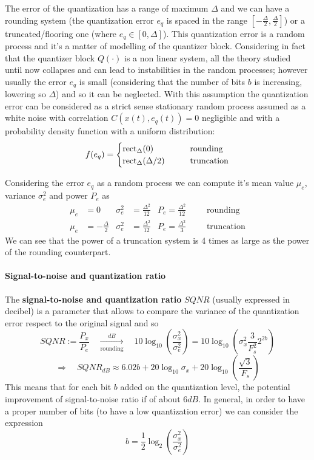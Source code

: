 	The error of the quantization has a range of maximum $\Delta$ and we can have a rounding system (the quantization error $e_q$ is spaced in the range $[-\frac \Delta 2, \frac \Delta 2]$) or a truncated/flooring one (where $e_q \in [0,\Delta]$). This quantization error is a random process and it's a matter of modelling of the quantizer block. Considering in fact that the quantizer block $Q(\cdot)$ is a non linear system, all the theory studied until now collapses and can lead to instabilities in the random processes; however usually the error $e_q$ is small (considering that the number of bits $b$ is increasing, lowering so $\Delta$) and so it can be neglected. With this assumption the quantization error can be considered as a strict sense stationary random process assumed as a white noise with correlation $C(x(t),e_q(t)) = 0$ negligible and with a probability density function with a uniform distribution:
	\[ f(e_q) = \begin{cases}
		\textrm{rect}_{\Delta}(0) \qquad &\textrm{rounding} \\
		\textrm{rect}_{\Delta}(\Delta/2) \qquad &\textrm{truncation} 
	\end{cases} \]
	
	Considering the error $e_q$ as a  random process we can compute it's mean value $\mu_e$, variance $\sigma_e^2$ and power $P_e$ as
	\begin{align*}
		\mu_e &= 0 &\sigma_e^2 &= \frac{\Delta^2}{12} & P_e =  \frac{\Delta^2}{12} &  &&\textrm{rounding} \\
		\mu_e &= -\frac{\Delta}{2} & \sigma_e^2 &= \frac{\Delta^2}{12} & P_e =  \frac{\Delta^2}{3} &  &&\textrm{truncation} 
	\end{align*}
	We can see that the power of a truncation system is 4 times as large as the power of the rounding counterpart.
	
	\paragraph{Signal-to-noise and quantization ratio} The \textbf{signal-to-noise and quantization ratio} $SQNR$ (usually expressed in decibel) is a parameter that allows to compare the variance of the quantization error respect to the original signal and so
	\[ SQNR := \frac{P_x}{P_e}  \quad \xrightarrow[\textrm{rounding}]{dB} \quad 10 \log_{10}\left(\frac{\sigma_x^2}{\sigma_e^2}\right) = 10 \log_{10}\left( \sigma_x^2 \frac{3}{F_s^2}2^{2b} \right)\]
	\[ \Rightarrow \quad SQNR_{dB} \approx 6.02b + 20 \log_{10} \sigma_x + 20 \log_{10}\left(\frac{\sqrt 3}{F_s} \right) \]
	This means that for each bit $b$ added on the quantization level, the potential improvement of signal-to-noise ratio if of about $6dB$. In general, in order to have a proper number of bits (to have a low quantization error) we can consider the expression
	\begin{equation}
		b = \frac 1 2 \log_2 \left(\frac{\sigma_x^2}{\sigma_e^2}\right)
	\end{equation}
		
